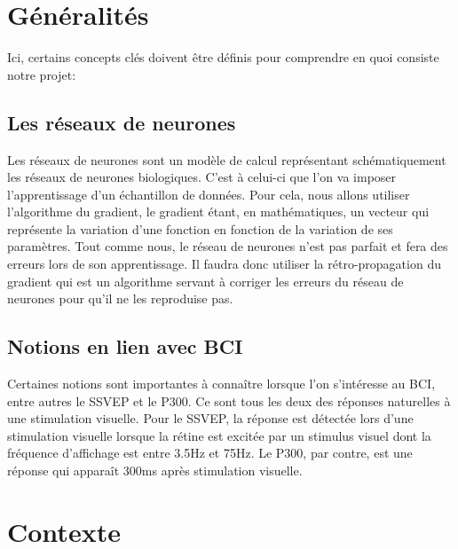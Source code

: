 	

	\section{Généralités} %
	\label{sec:généralité}
	
	Ici, certains concepts clés doivent être définis pour comprendre en quoi consiste notre projet: 
	\subsection{Les réseaux de neurones} %
	\label{sub:les_réseaux_de_neurones}
	 Les réseaux de neurones sont un modèle de calcul représentant schématiquement les réseaux de neurones biologiques. C'est à celui-ci que 
	l'on va imposer l'apprentissage d'un échantillon de données. Pour cela, nous allons 
	utiliser l'algorithme du gradient, le gradient étant, en mathématiques, un vecteur qui
	 représente la variation d'une fonction en fonction de la variation de ses paramètres. Tout
	  comme nous, le réseau de neurones n'est pas parfait et fera des erreurs lors de son 
	  apprentissage. Il faudra donc utiliser la rétro-propagation du gradient qui est un algorithme 
	  servant à corriger les erreurs du réseau de neurones pour qu'il ne les reproduise pas.

	\subsection{Notions en lien avec BCI} %
	\label{sub:notion_lien}
	Certaines notions sont importantes à connaître lorsque l'on s’intéresse au BCI, entre autres le SSVEP  et le P300. Ce sont tous les deux des réponses naturelles à une stimulation visuelle. Pour le SSVEP, la réponse est détectée lors d'une stimulation visuelle lorsque la rétine est excitée par un stimulus visuel dont la fréquence d'affichage est entre 3.5Hz et 75Hz. Le P300, par contre, 
	est une réponse qui apparaît 300ms après stimulation visuelle. 
	

	\section{Contexte} %
	\label{sec:contexte}
	
